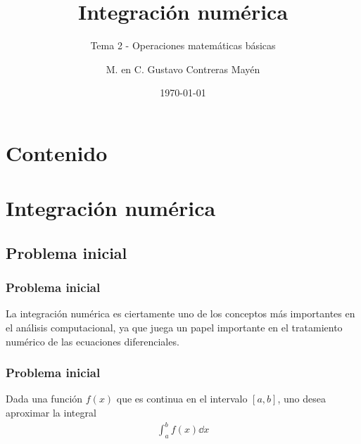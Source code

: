 %




\title{Integración numérica}
\subtitle{Tema 2 - Operaciones matemáticas básicas}
\author{M. en C. Gustavo Contreras Mayén}
\date{\today}

\maketitle
\fontsize{14}{14}\selectfont
{}
\section*{Contenido}
\section{Integración numérica}
\subsection{Problema inicial}
\begin{frame}
\frametitle{Problema inicial}
La integración numérica es ciertamente uno de los conceptos más importantes en el análisis computacional, ya que juega un papel importante en el tratamiento numérico de las ecuaciones diferenciales.
\end{frame}
\begin{frame}
\frametitle{Problema inicial}
Dada una función $f(x)$ que es continua en el intervalo $[a, b]$, uno desea aproximar la integral
\begin{align*}
\int_{a}^{b} f(x) \dd{x}
\end{align*}
\end{frame}
